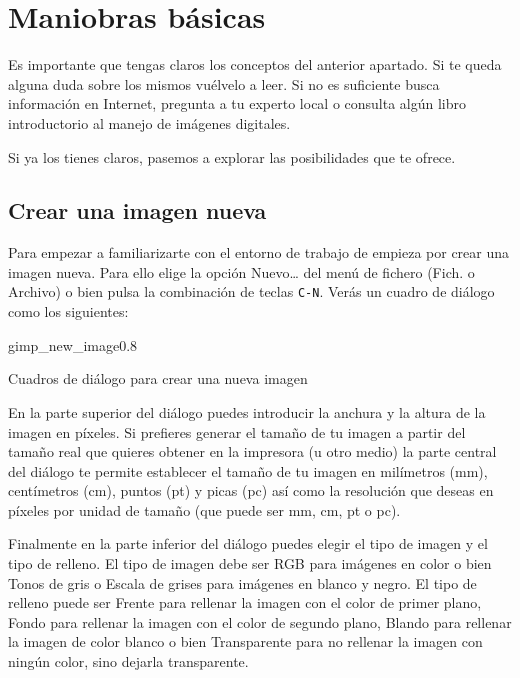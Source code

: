 \section{Maniobras básicas}

Es importante que  tengas claros los conceptos  del anterior apartado.
Si te  queda alguna duda  sobre los mismos vuélvelo  a leer. Si  no es
suficiente busca información en Internet,  pregunta a tu experto local
o consulta algún libro introductorio al manejo de imágenes digitales.

Si  ya los  tienes claros,  pasemos a  explorar las  posibilidades que
\gimp te ofrece.

\subsection{Crear una imagen nueva}

Para  empezar a  familiarizarte con  el  entorno de  trabajo de  \gimp
empieza por  crear una imagen  nueva. Para  ello elige la  opción {\sf
Nuevo\dots} del menú  de fichero ({\sf Fich.} o {\sf  Archivo}) o bien
pulsa la combinación  de teclas {\tt C-N}. Verás un  cuadro de diálogo
como los siguientes:

\begin{figura}{gimp_new_image}{0.8}
\caption{Cuadros de diálogo para crear una nueva imagen}
\end{figura}

En la  parte superior del  diálogo puedes  introducir la anchura  y la
altura de la  imagen en píxeles. Si prefieres generar  el tamaño de tu
imagen a partir del tamaño real que quieres obtener en la impresora (u
otro  medio) la  parte central  del diálogo  te permite  establecer el
tamaño de tu imagen en  milímetros (mm), centímetros (cm), puntos (pt)
y picas (pc)  así como la resolución que deseas  en píxeles por unidad
de tamaño (que puede ser mm, cm, pt o pc).

Finalmente en la  parte inferior del diálogo puedes elegir  el tipo de
imagen y el tipo de relleno. El tipo de imagen debe ser {\sf RGB} para
imágenes en color o bien {\sf Tonos  de gris} o {\sf Escala de grises}
para imágenes  en blanco y  negro. El tipo  de relleno puede  ser {\sf
Frente} para  rellenar la imagen  con el  color de primer  plano, {\sf
Fondo}  para  rellenar  la  imagen  con el  color  de  segundo  plano,
{\sf  Blando} para  rellenar la  imagen de  color blanco  o bien  {\sf
Transparente}  para  no rellenar  la  imagen  con ningún  color,  sino
dejarla transparente.

